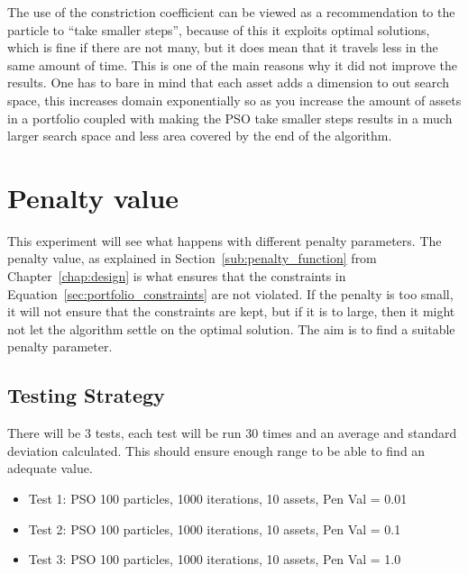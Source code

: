 \documentclass{pdfmx4020}
\begin{document}
      The use of the constriction coefficient can be viewed as a recommendation to the particle to ``take smaller steps''\cite{constriction_factor_4}, because of this it exploits optimal solutions, which is fine if there are not many, but it does mean that it travels less in the same amount of time. This is one of the main reasons why it did not improve the results. One has to bare in mind that each asset adds a dimension to out search space, this increases domain exponentially so as you increase the amount of assets in a portfolio coupled with making the PSO take smaller steps results in a much larger search space and less area covered by the end of the algorithm. 
       



  \section{Penalty value} %
  \label{sec:penalty_value}
  This experiment will see what happens with different penalty parameters. The penalty value, as explained in Section~\ref{sub:penalty_function} from Chapter~\ref{chap:design} is what ensures that the constraints in Equation~\ref{sec:portfolio_constraints} are not violated. If the penalty is too small, it will not ensure that the constraints are kept, but if it is to large, then it might not let the algorithm settle on the optimal solution. The aim is to find a suitable penalty parameter. 

    \subsection{Testing Strategy}
      There will be 3 tests, each test will be run 30 times and an average and standard deviation calculated. This should ensure enough range to be able to find an adequate value.
      \begin{itemize}
        \item Test 1: PSO 100 particles, 1000 iterations, 10 assets, Pen Val = 0.01
        \item Test 2: PSO 100 particles, 1000 iterations, 10 assets, Pen Val = 0.1
        \item Test 3: PSO 100 particles, 1000 iterations, 10 assets, Pen Val = 1.0
      \end{itemize}
\end{document}
